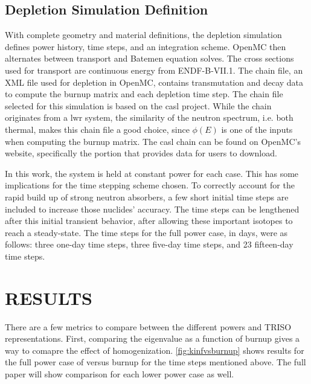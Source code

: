 \documentclass[letterpaper]{physor2024}
\begin{document}
\subsection{Depletion Simulation Definition}\label{sec:depl_sim}
With complete geometry and material definitions, the depletion simulation defines power history, time steps, and an integration scheme. OpenMC then alternates between transport and Batemen equation solves. The cross sections used for transport are continuous energy from ENDF-B-VII.1. The chain file, an XML file used for depletion in OpenMC, contains transmutation and decay data to compute the burnup matrix and each depletion time step. The chain file selected for this simulation is based on the \gls{casl} project. While the chain originates from a \gls{lwr} system, the similarity of the neutron spectrum, i.e. both thermal, makes this chain file a good choice, since $\phi(E)$ is one of the inputs when computing the burnup matrix. The \gls{casl} chain can be found on OpenMC's website, specifically the portion that provides data for users to download.

In this work, the system is held at constant power for each case. This has some implications for the time stepping scheme chosen. To correctly account for the rapid build up of strong neutron absorbers, a few short initial time steps are included to increase those nuclides' accuracy. The time steps can be lengthened after this initial transient behavior, after allowing these important isotopes to reach a steady-state. The time steps for the full power case, in days, were as follows: three one-day time steps, three five-day time steps, and 23 fifteen-day time steps.

\section{RESULTS}\label{sec:results}
There are a few metrics to compare between the different powers and TRISO representations. First, comparing the eigenvalue as a function of burnup gives a way to comapre the effect of homogenization.  \cref{fig:kinfvsburnup} shows results for the full power case of \kinf versus burnup for the time steps mentioned above. The full paper will show comparison for each lower power case as well.
\end{document}
